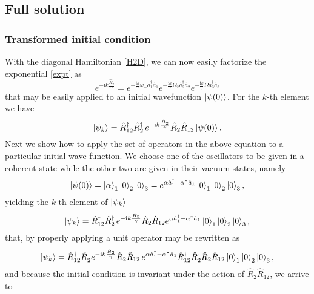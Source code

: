 \documentclass{article}
\newcommand{\mi}{\mathrm{i}}
\newcommand{\op}[1]{\hat{#1}}
\begin{document}
\subsection{Full solution}\label{sec:fulls}
\subsubsection*{Transformed initial condition}
With the diagonal Hamiltonian \eqref{H2D}, we can now easily factorize the exponential \eqref{expt} as
\begin{equation}\label{Expt}
    e^{-\mi k\frac{\op{H}_{2}}{\gamma}} = e^{-\frac{\mi k}{\gamma}\omega_{-} \op{a}^{\dagger}_{1}\op{a}_{1}}e^{-\frac{\mi k}{\gamma}\Omega_{2} \op{a}^{\dagger}_{2}\op{a}_{2}}e^{-\frac{\mi k}{\gamma}\Omega \op{a}_{3}^{\dagger}\op{a}_{3}}
\end{equation}
that may be easily applied to an initial wavefunction $\ket{\psi(0)}$. For the $k$-th element we have
\begin{equation}\label{pk}
    \ket{\psi_{k}}=\op{R}_{12}^{\dagger}\op{R}_{2}^{\dagger}\,e^{-\mi k\frac{\op{H}_2}{\gamma}}\op{R}_{2}\op{R}_{12}\ket{\psi(0)}.
\end{equation}
Next we show how to apply the set of operators in the above equation to a particular initial wave function. We choose one of the oscillators to be given in a coherent state while the other two are given in their vacuum states, namely
\begin{equation*}
\ket{\psi(0)} = \ket{\alpha}_{1}\ket{0}_{2}\ket{0}_{3} = e^{\alpha \op{a}_{1}^{\dagger}-\alpha^{*}\op{a}_{1}}\ket{0}_{1}\ket{0}_{2}\ket{0}_{3},
\end{equation*}
yielding the $k$-th element of $\ket{\psi_k}$ 
\begin{equation*}
    \ket{\psi_{k}}=\op{R}_{12}^{\dagger}\op{R}_{2}^{\dagger}\,e^{-\mi k\frac{\op{H}_{2}}{\gamma}}\op{R}_{2}\op{R}_{12}e^{\alpha \op{a}_{1}^{\dagger}-\alpha^{*}\op{a}_{1}}\ket{0}_{1}\ket{0}_{2}\ket{0}_{3},
\end{equation*}
that, by properly applying a unit operator may be rewritten as
\begin{equation*}
    \ket{\psi_{k}}=\op{R}_{12}^{\dagger}\op{R}_{2}^{\dagger}e^{-\mi k\frac{\op{H}_2}{\gamma}}\op{R}_{2}\op{R}_{12}\,e^{\alpha \op{a}_{1}^{\dagger}-\alpha^{*}\op{a}_{1}}\op{R}_{12}^{\dagger}\op{R}_{2}^{\dagger}\op{R}_{2}\op{R}_{12}\ket{0}_{1}\ket{0}_{2}\ket{0}_{3},
\end{equation*}
and because the initial condition is invariant under the action of $\op{R}_{2}\op{R}_{12}$, we arrive to
\end{document}
